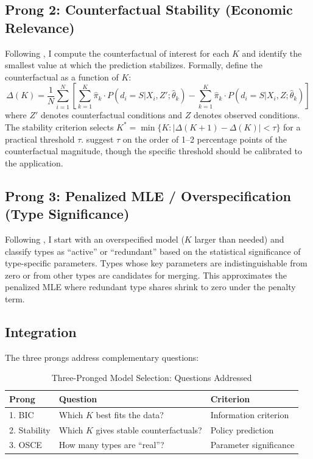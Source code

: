 \documentclass[12pt]{article}
\begin{document}
\subsection{Prong 2: Counterfactual Stability (Economic Relevance)}

Following \citet{bonhomme2022}, I compute the counterfactual of interest for each $K$ and identify the smallest value at which the prediction stabilizes. Formally, define the counterfactual as a function of $K$:
\begin{equation}
\Delta(K) = \frac{1}{N} \sum_{i=1}^{N} \left[ \sum_{k=1}^{K} \hat{\pi}_k \cdot P(d_i = S | X_i, Z'; \hat{\theta}_k) - \sum_{k=1}^{K} \hat{\pi}_k \cdot P(d_i = S | X_i, Z; \hat{\theta}_k) \right]
\end{equation}
where $Z'$ denotes counterfactual conditions and $Z$ denotes observed conditions. The stability criterion selects $K^* = \min\{K : |\Delta(K+1) - \Delta(K)| < \tau\}$ for a practical threshold $\tau$. \citet{bonhomme2022} suggest $\tau$ on the order of 1--2 percentage points of the counterfactual magnitude, though the specific threshold should be calibrated to the application.

\subsection{Prong 3: Penalized MLE / Overspecification (Type Significance)}

Following \citet{budanova2025}, I start with an overspecified model ($K$ larger than needed) and classify types as ``active'' or ``redundant'' based on the statistical significance of type-specific parameters. Types whose key parameters are indistinguishable from zero or from other types are candidates for merging. This approximates the penalized MLE where redundant type shares shrink to zero under the penalty term.

\subsection{Integration}

The three prongs address complementary questions:

\begin{table}[H]
\centering
\caption{Three-Pronged Model Selection: Questions Addressed}
\label{tab:prongs}
\begin{tabular}{lll}
\toprule
Prong & Question & Criterion \\
\midrule
1. BIC & Which $K$ best fits the data? & Information criterion \\
2. Stability & Which $K$ gives stable counterfactuals? & Policy prediction \\
3. OSCE & How many types are ``real''? & Parameter significance \\
\bottomrule
\end{tabular}
\end{table}
\end{document}
